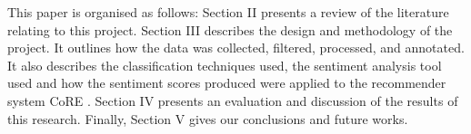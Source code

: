 This paper is organised as follows: Section II presents a review of the literature relating to this project. Section III describes the design and methodology of the project. It outlines how the data was collected, filtered, processed, and annotated. It also describes the classification techniques used, the sentiment analysis tool used and how the sentiment scores produced were applied to the recommender system CoRE \cite{core2019}. Section IV presents an evaluation and discussion of the results of this research. Finally, Section V gives our conclusions and future works.